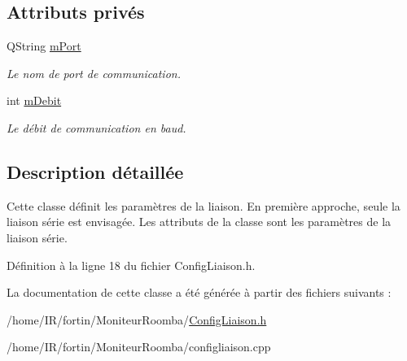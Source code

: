 \subsection*{Attributs privés}
\begin{DoxyCompactItemize}
\item 
Q\+String \hyperlink{class_config_liaison_a605dab2080bf9d7944edf7146dc23d3c}{m\+Port}\hypertarget{class_config_liaison_a605dab2080bf9d7944edf7146dc23d3c}{}\label{class_config_liaison_a605dab2080bf9d7944edf7146dc23d3c}

\begin{DoxyCompactList}\small\item\em Le nom de port de communication. \end{DoxyCompactList}\item 
int \hyperlink{class_config_liaison_aed444290c04caf89c334e9b871d61b96}{m\+Debit}\hypertarget{class_config_liaison_aed444290c04caf89c334e9b871d61b96}{}\label{class_config_liaison_aed444290c04caf89c334e9b871d61b96}

\begin{DoxyCompactList}\small\item\em Le débit de communication en baud. \end{DoxyCompactList}\end{DoxyCompactItemize}


\subsection{Description détaillée}
Cette classe définit les paramètres de la liaison. En première approche, seule la liaison série est envisagée. Les attributs de la classe sont les paramètres de la liaison série. 

Définition à la ligne 18 du fichier Config\+Liaison.\+h.



La documentation de cette classe a été générée à partir des fichiers suivants \+:\begin{DoxyCompactItemize}
\item 
/home/\+I\+R/fortin/\+Moniteur\+Roomba/\hyperlink{_config_liaison_8h}{Config\+Liaison.\+h}\item 
/home/\+I\+R/fortin/\+Moniteur\+Roomba/configliaison.\+cpp\end{DoxyCompactItemize}
